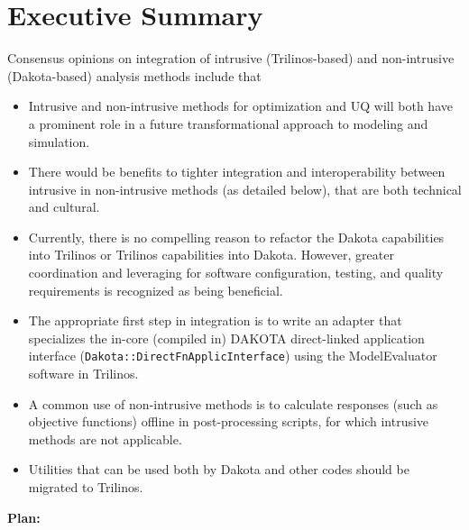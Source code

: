 \documentclass[pdf,ps2pdf,11pt]{SANDreport}
\begin{document}


\section{Executive Summary}

Consensus opinions on integration of intrusive (Trilinos-based) and
non-intrusive (Dakota-based) analysis methods include that

\begin{itemize}

{}\item{}Intrusive and non-intrusive methods for optimization and UQ will both
have a prominent role in a future transformational approach to modeling and
simulation.

{}\item{}There would be benefits to tighter integration and interoperability
between intrusive in non-intrusive methods (as detailed below), that are both
technical and cultural.

{}\item{}Currently, there is no compelling reason to refactor the Dakota
capabilities into Trilinos or Trilinos capabilities into Dakota. However,
greater coordination and leveraging for software configuration, testing, and
quality requirements is recognized as being beneficial.

{}\item{}The appropriate first step in integration is to write an adapter that
specializes the in-core (compiled in) DAKOTA direct-linked application
interface ({}\texttt{Dakota\-::Direct\-Fn\-Applic\-Interface}) using the
ModelEvaluator software in Trilinos.

{}\item{}A common use of non-intrusive methods is to calculate responses (such
as objective functions) offline in post-processing scripts, for which
intrusive methods are not applicable.

{}\item{}Utilities that can be used both by Dakota and other codes should be
migrated to Trilinos.

\end{itemize}

{}\noindent\textbf{Plan:}
\end{document}
